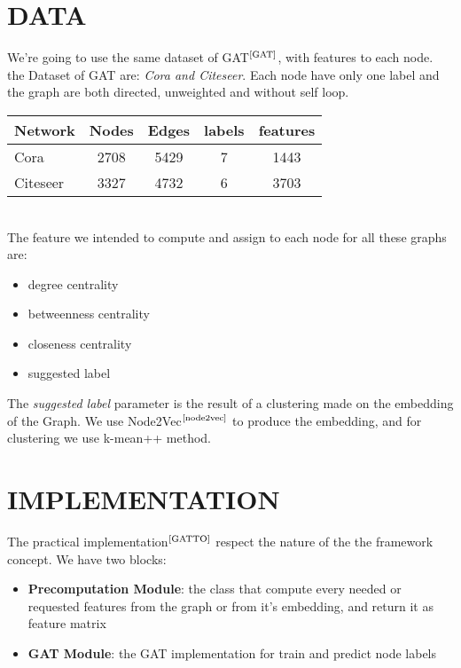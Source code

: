 \documentclass[12pt,conference]{ieeeconf} %
\begin{document}
\section{DATA} 
We're going to use the same dataset of GAT$^\text{\cite{GAT}}$, with features to each node.
the Dataset of GAT are: \textit{Cora and Citeseer}. Each node have only one label and the graph are both directed, unweighted and without self loop.
\\
\begin{table}[h!]
    \centering
    \renewcommand{\arraystretch}{1.5}
    \begin{tabular}{|l|c|c|c|c|}
    \hline
    \textbf{Network} & \textbf{Nodes} & \textbf{Edges} & \textbf{labels} & \textbf{features} \\
    \hline
    Cora           & 2708 & 5429  & 7  & 1443  \\
    Citeseer       & 3327 & 4732  & 6  & 3703  \\
    \hline
    \end{tabular}
\end{table}
\\
The feature we intended to compute and assign to each node for all these graphs are:
\begin{itemize}
    \item degree centrality
    \item betweenness centrality
    \item closeness centrality
    \item suggested label
\end{itemize}
The \textit{suggested label} parameter is the result of a clustering made on the embedding of the Graph.
We use Node2Vec$^\text{\cite{node2vec}}$ to produce the embedding, and for clustering we use k-mean++ method.


\section{IMPLEMENTATION} 
The practical implementation$^{\text{\cite{GATTO}}}$ respect the nature of the the framework concept.
We have two blocks:
\begin{itemize}
    \item{\textbf{Precomputation Module}: the class that compute every needed or requested features from the graph or from it's embedding, and return it as feature matrix}
    \item{\textbf{GAT Module}: the GAT implementation for train and predict node labels}
\end{itemize}
\end{document}
